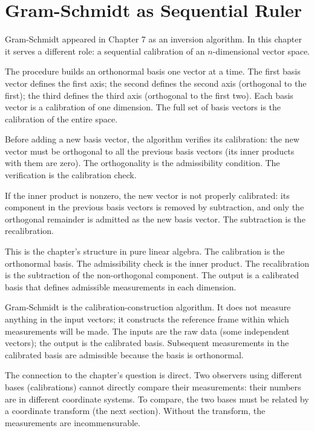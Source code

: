 \section{Gram-Schmidt as Sequential Ruler}
\label{se:gram-schmidt-as-sequential-ruler}

Gram-Schmidt appeared in Chapter 7 as an inversion algorithm. In this
chapter it serves a different role: a sequential calibration of an
$n$-dimensional vector space.

The procedure builds an orthonormal basis one vector at a time. The
first basis vector defines the first axis; the second defines the
second axis (orthogonal to the first); the third defines the third
axis (orthogonal to the first two). Each basis vector is a calibration
of one dimension. The full set of basis vectors is the calibration of
the entire space.

Before adding a new basis vector, the algorithm verifies its
calibration: the new vector must be orthogonal to all the previous
basis vectors (its inner products with them are zero). The
orthogonality is the admissibility condition. The verification is the
calibration check.

If the inner product is nonzero, the new vector is not properly
calibrated: its component in the previous basis vectors is removed
by subtraction, and only the orthogonal remainder is admitted as the
new basis vector. The subtraction is the recalibration.

This is the chapter's structure in pure linear algebra. The
calibration is the orthonormal basis. The admissibility check is the
inner product. The recalibration is the subtraction of the
non-orthogonal component. The output is a calibrated basis that
defines admissible measurements in each dimension.

Gram-Schmidt is the calibration-construction algorithm. It does not
measure anything in the input vectors; it constructs the reference
frame within which measurements will be made. The inputs are the
raw data (some independent vectors); the output is the calibrated
basis. Subsequent measurements in the calibrated basis are
admissible because the basis is orthonormal.

The connection to the chapter's question is direct. Two observers
using different bases (calibrations) cannot directly compare their
measurements: their numbers are in different coordinate systems. To
compare, the two bases must be related by a coordinate transform
(the next section). Without the transform, the measurements are
incommensurable.

